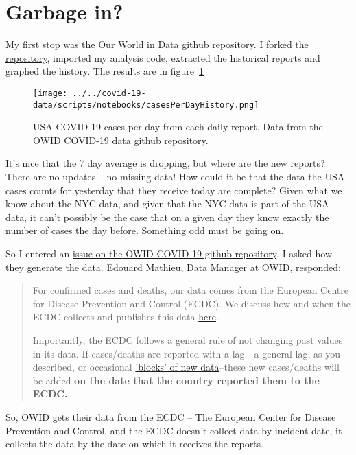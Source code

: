 \documentclass[10pt,reqno]{amsart}
\begin{document}
\section{Garbage in?}
My first stop was the
\href{https://github.com/owid/covid-19-data}{Our World in Data github
  repository}.  I
\href{https://github.com/hjstein/covid-19-data}{forked the
  repository}, imported my analysis code, extracted the historical
reports and graphed the history.  The results are in figure~\ref{fig:owid}

\begin{figure}[H]
  \centering
  \texttt{[image: ../../covid-19-data/scripts/notebooks/casesPerDayHistory.png]}
  \caption{USA COVID-19 cases per day from each daily report.  Data
    from the OWID COVID-19 data github repository.}
  \label{fig:owid}
\end{figure}

It's nice that the 7 day average is dropping, but where are the new
reports?  There are no updates -- no missing data!  How could it be
that the data the USA cases counts for yesterday that they receive
today are complete?  Given what we know about the NYC data, and given
that the NYC data is part of the USA data, it can't possibly be the
case that on a given day they know exactly the number of cases the day
before.  Something odd must be going on.

So I entered an
\href{https://github.com/owid/covid-19-data/issues/41}{issue on the
  OWID COVID-19 github repository}.  I asked how they generate the
data.  Edouard Mathieu, Data Manager at OWID, responded:
\begin{quotation}
  For confirmed cases and deaths, our data comes from the European
  Centre for Disease Prevention and Control (ECDC). We discuss how and
  when the ECDC collects and publishes this data \href{https://ourworldindata.org/coronavirus#our-world-in-data-relies-on-data-from-the-european-cdc}{here}.

  Importantly, the ECDC follows a general rule of not changing past
  values in its data. If cases/deaths are reported with a lag—a general
  lag, as you described, or occasional
  \href{https://www.theguardian.com/us-news/2020/apr/15/new-york-city-coronavirus-death-toll-jumps-revised-count}{'blocks'
    of new data}--these new
  cases/deaths will be added \bf{on the date that the country reported them
    to the ECDC.}
\end{quotation}

So, OWID gets their data from the ECDC -- The European Center for
Disease Prevention and Control, and the ECDC doesn't collect data by
incident date, it collects the data by the date on which it receives
the reports.
\end{document}
